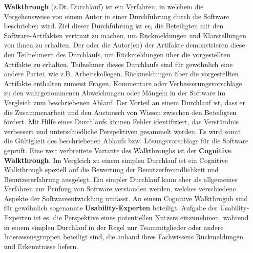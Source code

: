 \textbf{Walkthrough} (z.Dt. Durchlauf) ist ein Verfahren, in welchem die Vorgehensweise von einem Autor in einer Durchführung durch die Software beschrieben wird.
Ziel dieser Durchführung ist es, die Beteiligten mit den Software-Artifakten vertraut zu machen, um Rückmeldungen und Klarstellungen von ihnen zu erhalten.
Der oder die Autor(en) der Artifakte demonstrieren diese den Teilnehmern des Durchlaufs, um Rückmeldungen über die vorgestellten Artifakte zu erhalten.
Teilnehmer dieses Durchlaufs sind für gewöhnlich eine andere Partei, wie z.B. Arbeitskollegen.
Rückmeldungen über die vorgestellten Artifakte enthalten zumeist Fragen, Kommentare oder Verbesserungsvorschläge zu den wahrgenommenen Abweichungen oder Mängeln in der Software im Vergleich zum beschriebenen Ablauf.
Der Vorteil an einem Durchlauf ist, dass er die Zusammenarbeit und den Austausch von Wissen zwischen den Beteiligten fördert.
Mit Hilfe eines Durchlaufs können Fehler identifiziert, das Verständnis verbessert und unterschiedliche Perspektiven gesammelt werden.
Es wird somit die Gültigkeit des beschriebenen Ablaufs bzw. Lösungsvorschlags für die Software geprüft.
Eine weit verbreitete Variante des Walkthroughs ist der \textbf{Cognitive Walkthrough}.
Im Vergleich zu einem simplen Durchlauf ist ein Cognitive Walkthrough speziell auf die Bewertung der Benutzerfreundlichkeit und Benutzererfahrung ausgelegt.
Ein simpler Durchlauf kann eher als allgemeines Verfahren zur Prüfung von Software verstanden werden, welches verschiedene Aspekte der Softwareentwicklung umfasst.
An einem Cognitive Walkthroguh sind für gewöhnlich sogenannte \textbf{Usability-Experten} beteiligt. 
Aufgabe der Usability-Experten ist es, die Perspektive eines potentiellen Nutzers einzunehmen, während in einem simplen Durchlauf in der Regel nur Teammitglieder oder andere Interessensgruppen beteiligt sind, die anhand ihres Fachwissens Rückmeldungen und Erkenntnisse liefern.

